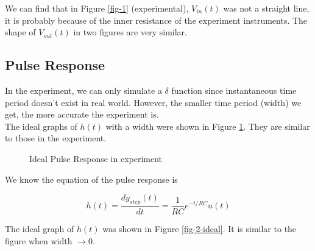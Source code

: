 \documentclass{article}
\begin{document}
We can find that in Figure \ref{fig-1} (experimental), $V_{in}(t)$ was not a straight line, it is probably because of the inner resistance of the experiment instruments. The shape of $V_{out}(t)$ in two figures are very similar.

\subsection{Pulse Response}
In the experiment, we can only simulate a $\delta$ function since instantaneous time period doesn't exist in real world. However, the smaller time period (width) we get, the more accurate the experiment is. \\

The ideal graphs of $h(t)$ with a width were shown in Figure \ref{fig-2-ideal-width}. They are similar to those in the experiment.\\


\begin{figure}[htbp]
	\centering
	\caption{Ideal Pulse Response in experiment}
	\label{fig-2-ideal-width}
\end{figure}

We know the equation of the pulse response is

$$h(t)=\frac{dy_{step}(t)}{dt}=\frac{1}{RC}e^{-t/RC}u(t)$$

The ideal graph of $h(t)$ was shown in Figure \ref{fig-2-ideal}. It is similar to the figure when width $\to 0$.
\end{document}
